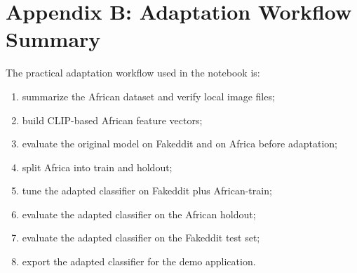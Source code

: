 \documentclass[a4paper,10.5pt,twoside]{article}
\begin{document}
\section{Appendix B: Adaptation Workflow Summary}
The practical adaptation workflow used in the notebook is:
\begin{enumerate}[leftmargin=1.5em]
    \item summarize the African dataset and verify local image files;
    \item build CLIP-based African feature vectors;
    \item evaluate the original model on Fakeddit and on Africa before adaptation;
    \item split Africa into train and holdout;
    \item tune the adapted classifier on Fakeddit plus African-train;
    \item evaluate the adapted classifier on the African holdout;
    \item evaluate the adapted classifier on the Fakeddit test set;
    \item export the adapted classifier for the demo application.
\end{enumerate}



\end{document}
